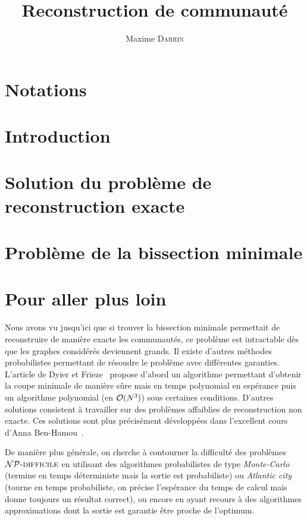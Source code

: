 \documentclass[fleqn,11pt, titlepage, french]{article}
\title{Reconstruction de communauté}
\author{Maxime \textsc{Darrin}}
\begin{document}
	\maketitle
	\tableofcontents

	\newpage
	
	\section*{Notations}
	
	
	
	\newpage
	\section{Introduction}
	
	
	\section{Solution du problème de reconstruction exacte}
	
	
	
	\section{Problème de la bissection minimale}
	
	
	
	\section{Pour aller plus loin}
	
	Nous avons vu jusqu'ici que si trouver la bissection minimale permettait de reconstruire de manière exacte les communautés, ce problème est intractable dès que les graphes considérés deviennent grands. Il existe d'autres méthodes probabilistes permettant de résoudre le problème avec différentes garanties. L'article de Dyier et Frieze~\cite{dyier} propose d'abord un algorithme permettant d'obtenir la coupe minimale de manière sûre mais en temps polynomial en espérance puis un algorithme polynomial (en $\mathcal O(N^3)$) sous certaines conditions. D'autres solutions consistent à travailler sur des problèmes affaiblies de reconstruction non exacte. Ces solutions sont plus précisément développées dans l'excellent cours d'Anna Ben-Hamou~\cite{ig}.
	
	De manière plus générale, on cherche à contourner la difficulté des problèmes $\mathcal{NP}\text{\textsc{-difficile}}$ en utilisant des algorithmes probabilistes de type \emph{Monte-Carlo} (termine en temps déterministe mais la sortie est probabiliste) ou \emph{Atlantic city} (tourne en temps probabiliste, on précise l'espérance du temps de calcul mais donne toujours un résultat correct), ou encore en ayant recours à des algorithmes approximations dont la sortie est garantie être proche de l'optimum.
	
\end{document}
